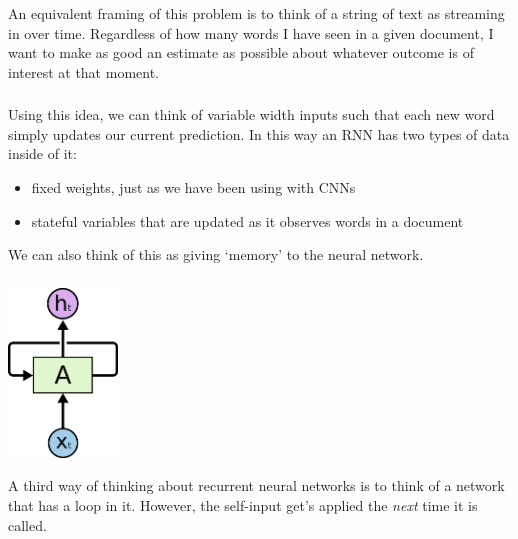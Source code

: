 \documentclass[xetex,mathserif,serif,aspectratio=169]{beamer}
\begin{document}
\begin{frame}[fragile] \frametitle{} \oldB \small


An equivalent framing of this problem is to think of a string
of text as streaming in over time. Regardless of how many words
I have seen in a given document, I want to make as good an
estimate as possible about whatever outcome is of interest at
that moment.

\end{frame}

\begin{frame}[fragile] \frametitle{} \oldB \small


Using this idea, we can think of variable width inputs
such that each new word simply updates our current prediction.
In this way an RNN has two types of data inside of it:
\begin{itemize}
\item fixed weights, just as we have been using with CNNs
\item stateful variables that are updated as it observes words
in a document
\end{itemize}
We can also think of this as giving `memory' to the neural
network.

\end{frame}

\begin{frame}[fragile] \frametitle{} \oldB \small

\begin{center}
\includegraphics[height=4.5cm]{img/cloah01.png}
\end{center}

A third way of thinking about recurrent neural networks is to
think of a network that has a loop in it. However, the self-input
get's applied the \textit{next} time it is called.

\end{frame}
\end{document}
